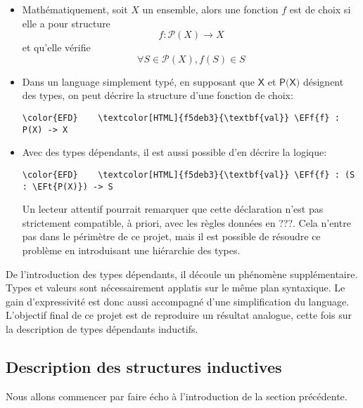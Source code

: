 \documentclass[11pt]{article}
\newcommand{\EFf}[1]{\textcolor{EFf}{#1}} %
\newcommand{\EFt}[1]{\textcolor{EFt}{#1}} %
\begin{document}
\begin{itemize}
\item Mathématiquement, soit \(X\) un ensemble, alors une fonction \(f\) est de choix si elle a pour structure \[ f : \mathcal{P}(X) \to X    \] et qu'elle vérifie \[\forall S \in \mathcal{P}(X), f(S) \in S\]

\item Dans un language simplement typé, en supposant que \(\textsf{X}\) et \(\textsf{P(X)}\) désignent des types, on peut décrire la structure d'une fonction de choix:

\begin{Code}
\begin{Verbatim}
\color{EFD}    \textcolor[HTML]{f5deb3}{\textbf{val}} \EFf{f} : P(X) -> X
\end{Verbatim}
\end{Code}

\item Avec des types dépendants, il est aussi possible d'en décrire la logique:

\begin{Code}
\begin{Verbatim}
\color{EFD}    \textcolor[HTML]{f5deb3}{\textbf{val}} \EFf{f} : (S : \EFt{P(X)}) -> S
\end{Verbatim}
\end{Code}

Un lecteur attentif pourrait remarquer que cette déclaration n'est pas strictement compatible, à priori, avec les règles données en ???. Cela n'entre pas dans le périmètre de ce projet, mais il est possible de résoudre ce problème en introduisant une hiérarchie des types.
\end{itemize}

De l'introduction des types dépendants, il découle un phénomène supplémentaire. Types et valeurs sont nécessairement applatis sur le même plan syntaxique. Le gain d'expressivité est donc aussi accompagné d'une simplification du language. L'objectif final de ce projet est de reproduire un résultat analogue, cette fois sur la description de types dépendants inductifs.

\subsection{Description des structures inductives}
\label{sec:orgb4d780d}

Nous allons commencer par faire écho à l'introduction de la section précédente.
\end{document}
